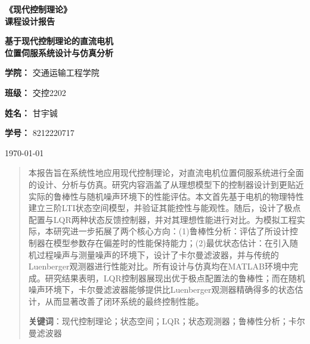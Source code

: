 \documentclass[12pt, a4paper]{article}
\begin{document}
\begin{titlepage}
    \centering
    \vspace*{3cm} %
    
    \Huge \textbf{《现代控制理论》\\ [0.5em]课程设计报告}
    
    \vspace{2cm} %
    
    {\Huge \bfseries 基于现代控制理论的直流电机\\[0.5em]位置伺服系统设计与仿真分析\par}
    
    \vspace{3cm} %
    
    \Large \textbf{学院：} 交通运输工程学院
    
    \vspace{0.5cm}
    
    \Large \textbf{班级：} 交控2202
    
    \vspace{0.5cm}
    
    \Large \textbf{姓名：} 甘宇铖
    
    \vspace{0.5cm}
    
    \Large \textbf{学号：} 8212220717
    
    \vfill %
    
    {\large \today}
\end{titlepage}


\begin{abstract}
\noindent
本报告旨在系统性地应用现代控制理论，对直流电机位置伺服系统进行全面的设计、分析与仿真。研究内容涵盖了从理想模型下的控制器设计到更贴近实际的鲁棒性与随机噪声环境下的性能评估。本文首先基于电机的物理特性建立三阶LTI状态空间模型，并验证其能控性与能观性。随后，设计了极点配置与LQR两种状态反馈控制器，并对其理想性能进行对比。为模拟工程实际，本研究进一步拓展了两个核心方向：(1)鲁棒性分析：评估了所设计控制器在模型参数存在偏差时的性能保持能力；(2)最优状态估计：在引入随机过程噪声与测量噪声的环境下，设计了卡尔曼滤波器，并与传统的Luenberger观测器进行性能对比。所有设计与仿真均在MATLAB环境中完成。研究结果表明，LQR控制器展现出优于极点配置法的鲁棒性；而在随机噪声环境下，卡尔曼滤波器能够提供比Luenberger观测器精确得多的状态估计，从而显著改善了闭环系统的最终控制性能。
\vspace{1em} 

\noindent
\textbf{关键词}：现代控制理论；状态空间；LQR；状态观测器；鲁棒性分析；卡尔曼滤波器
\end{abstract}
\end{document}
